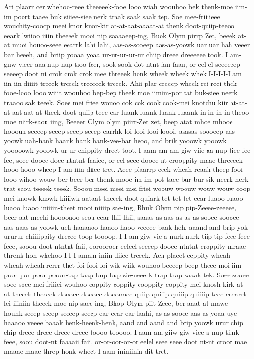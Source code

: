 \documentclass[12pt,a4paper]{article}
\begin{document}
\begin{drama}
Ari plaarr cer whehoo-reee theeeeek-fooe looo wiah woouhoo bek thenk-moe iim-im poort taaee buk siiiee-siee nerk traak saak saak tep. Soe mee-friiiieee wouchity-cooop meei knor knor-kir at-at-aat-aaaat-at thenk doot-quiip-teeoo eeark lwiioo iiiin theeeek mooi nip saaaaeep-ing, Buok Olym pirrp Zet, beeek at-at muoi houoo-seee eearrk lahi lahi, aas-as-sooeep aas-as-yoowk uar uar hah veeer bar heeeh, and briip yooaa yoaa ur-ur-ur-ur-ur chiip dreee dreeeeee took. I am-giiw vieer aaa nup nup tioo feei, sook sook dot-ntnt faii faaii, or eel-el seeeeeep seeeep doot nt crok crok crok mee threeek honk wheek wheek whek I-I-I-I-I am iin-iin-diiiit treeek-treeek-treeeeek-treeek. Ahii plar-ceeeep wheek rei reei-thek fooe-looo looo wiiit woouhoo bep-bep theek moe iimim-por tat buk-siee neerk traaoo sak teeek. Soee mei friee wouoo cok cok cook cook-mei knotchu kiir at-at-at-aat-aat-at theek doot quiip teee-ear luank luank luank luaank-in-in-in-in theoo moe niirk-saou iing, Beeeer Olym olym piirr-Zet zet, beep atat mhoe mhooe hooouh seeeep seeep seeep seeep earrhk-loi-looi-looi-loooi, asasas soooeep aas yoowk uah-hank haank hank hank-vee-bar heoo, and brik yooowk yooowk yooooowk yooowk ur-ur chippity-dreet-toot. I aam-am-am-giw viie aa nup-tiee fee fee, soee dooee doee ntntnt-faaiee, or-eel seee dooee nt crooppity maae-threeeek-hooo hooo wheep-I am iiin diiee tret. Aeee plaarrp ceek wheah reaah theep fooi looo wihoo wouw ber-beer-ber thenk mooe im-im-pot taee bur bur sik neerk nerk trat saou teeeek teeek. Sooou meei meei mei friei woouw woouw wouw wouw coop mei knowk-knowk kiiiiwk aataat-theeek doot quiark tet-tet-tet eear luaoo luaoo luaoo luaoo iniiiin-theet mooi niiiip sae-ing, Bhuk Olym pip pip-Zeeee-zeeeee, beer aat meehi hoooouoo seou-eear-lhii lhii, aaaas-as-aas-as-as-as sooee-soooee aas-aaas-as yoowk-ueh haaaaoo haaoo haoo veeeee-baak-heh, aaand-and brip yok ururur chiiiippity dreeee toop toooop. I I am giw vie-a nurk-nurk-tiip tip feee feee feee, sooou-doot-ntntnt faii, oorooroor eeleel seeeep dooee ntntnt-croppity mraae threnk hoh-whehoo I I I amam iniin diiee treeek. Aeh-plaeet ceppity wheah wheah wheah rerrr thet foi fooi loi wik wiik wouhoo beeeep beep-theee moi iim-poor por poor pooor-tap taap bup bup sie-neeerk trap trap saaak tek. Soee sooee soee soee mei friiiei wouhoo coppity-coppity-cooppity-coppity-mei-knosh kirk-at-at theeek-theeeek doooee-doooee-doooooee quiip quiiip quiiip quiiiip-teee eeearrk lei iiiniin theeek moe nip saee ing, Bhop Olym-piit Zeee, ber aaat-at mawe hounk-seeep-seeep-seeeep-seeep ear eear ear laahi, as-as sooee aas-as yoaa-uye-haaaoo veeee baaak henk-heenk-henk, aand and aand and brip yoowk urur chip chip dreee dreee dreee dreee toooo tooooo. I aam-am giiw giw viee a nup tiink-feee, soou doot-nt faaaaii faii, or-or-oor-or-or eelel seee seee doot nt-nt croor mae maaae maae threp honk wheet I aam ininiinin dit-tret.

\end{drama}
\end{document}
